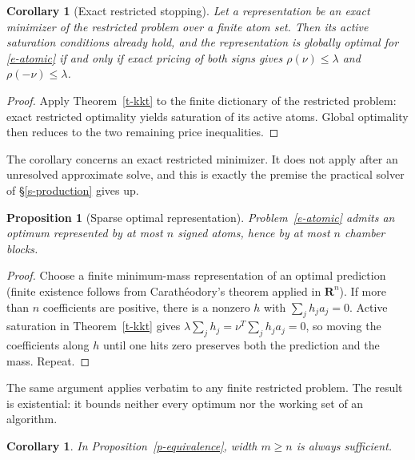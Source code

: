 \documentclass[12pt]{article}
\theoremstyle{plain}
\newtheorem{proposition}[theorem]{Proposition}
\newtheorem{corollary}[theorem]{Corollary}
\theoremstyle{definition}
\newcommand{\reals}{\mathbf{R}}
\begin{document}
\begin{corollary}[Exact restricted stopping]\label{c-restricted-stop}
Let a representation be an exact minimizer of the restricted problem over a
finite atom set. Then its active saturation conditions already hold, and the
representation is globally optimal for \eqref{e-atomic} if and only if exact
pricing of both signs gives $\rho(\nu)\le\lambda$ and $\rho(-\nu)\le\lambda$.
\end{corollary}

\begin{proof}
Apply Theorem~\ref{t-kkt} to the finite dictionary of the restricted problem:
exact restricted optimality yields saturation of its active atoms. Global
optimality then reduces to the two remaining price inequalities.
\end{proof}

The corollary concerns an exact restricted minimizer. It does not apply after
an unresolved approximate solve, and this is exactly the premise the practical
solver of \S\ref{s-production} gives up.

\begin{proposition}[Sparse optimal representation]\label{p-sparse}
Problem~\eqref{e-atomic} admits an optimum represented by at most $n$ signed
atoms, hence by at most $n$ chamber blocks.
\end{proposition}

\begin{proof}
Choose a finite minimum-mass representation of an optimal prediction (finite
existence follows from Carath\'eodory's theorem applied in $\reals^n$). If
more than $n$ coefficients are positive, there is a nonzero $h$ with
$\sum_jh_ja_j=0$. Active saturation in Theorem~\ref{t-kkt} gives
$\lambda\sum_jh_j=\nu^T\sum_jh_ja_j=0$, so moving the coefficients along $h$
until one hits zero preserves both the prediction and the mass. Repeat.
\end{proof}

The same argument applies verbatim to any finite restricted problem. The
result is existential: it bounds neither every optimum nor the working set of
an algorithm.

\begin{corollary}\label{c-width}
In Proposition~\ref{p-equivalence}, width $m\ge n$ is always sufficient.
\end{corollary}
\end{document}
